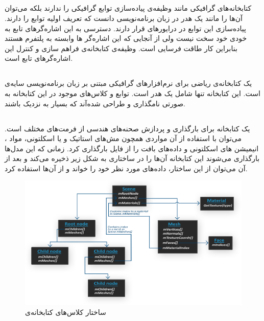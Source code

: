 \subsection{}
کتابخانه‌های گرافیکی مانند
وظیفه‌‌ی پیاده‌سازی توابع گرافیکی را ندارند بلکه می‌توان آن‌ها را مانند یک هدر در زبان 
برنامه‌نویسی 
دانست که تعریف اولیه توابع را دارند. پیاده‌سازی این توابع در درایور‌های 
قرار دارند.
دسترسی به این اشاره‌گر‌‌های تابع به خودی خود سخت نیست ولی از آنجایی که این اشاره‌گر ها وابسته به پلتفرم هستند بنابراین کار طاقت فرسایی است. 
وظیفه‌ی کتابخانه‌ی 
فراهم سازی و کنترل این اشاره‌گرهای تابع است.
\cite{GLAD}


\subsection{}
یک کتابخانه‌ی ریاضی برای نرم‌افزارهای گرافیکی مبتنی بر زبان برنامه‌نویسی سایه‌ی 
است. این کتابخانه تنها شامل یک هدر 
است.
توابع و کلاس‌های موجود در این کتابخانه به صورتی نامگذاری و طراحی شده‌آند که بسیار به 
 نزدیک باشند.


 \subsection{}

 یک کتابخانه برای بارگذاری و پردازش صحنه‌های هندسی از فرمت‌های مختلف است.
 می‌توان با استفاده از آن مواردی همچون مش‌های استاتیک و یا اسکلتونی، مواد 
 ، انیمیشن های اسکلتونی و داده‌‌های بافت را از فایل بارگذاری کرد.
زمانی که این مدل‌ها بارگذاری می‌شوند این کتابخانه آن‌ها را در ساختاری به شکل زیر ذخیره می‌کند و بعد از آن می‌توان از این ساختار، داده‌های مورد نظر خود را خواند و از آن‌ها استفاده کرد.
\cite{Assimp} \cite{LearnOpenGL_Assimp}

\begin{figure}[ht]
	\centerline{\includegraphics[width=\textwidth,height=\textheight,keepaspectratio]{Figures/Ch5/assimp_structure.png}}

	\caption{ساختار کلاس‌های کتابخانه‌ی  \cite{LearnOpenGL_Assimp}}
	\label{fig:Assimp}
  \end{figure}
  


